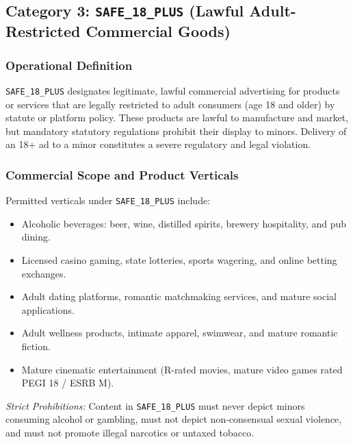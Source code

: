 \documentclass[12pt,a4paper]{report}
\begin{document}
\subsection{Category 3: \texttt{SAFE\_18\_PLUS} (Lawful Adult-Restricted Commercial Goods)}

\subsubsection{Operational Definition}
\texttt{SAFE\_18\_PLUS} designates legitimate, lawful commercial advertising for products or services that are legally restricted to adult consumers (age 18 and older) by statute or platform policy. These products are lawful to manufacture and market, but mandatory statutory regulations prohibit their display to minors. Delivery of an 18+ ad to a minor constitutes a severe regulatory and legal violation.

\subsubsection{Commercial Scope and Product Verticals}
Permitted verticals under \texttt{SAFE\_18\_PLUS} include:
\begin{itemize}
    \item Alcoholic beverages: beer, wine, distilled spirits, brewery hospitality, and pub dining.
    \item Licensed casino gaming, state lotteries, sports wagering, and online betting exchanges.
    \item Adult dating platforms, romantic matchmaking services, and mature social applications.
    \item Adult wellness products, intimate apparel, swimwear, and mature romantic fiction.
    \item Mature cinematic entertainment (R-rated movies, mature video games rated PEGI 18 / ESRB M).
\end{itemize}
\emph{Strict Prohibitions:} Content in \texttt{SAFE\_18\_PLUS} must never depict minors consuming alcohol or gambling, must not depict non-consensual sexual violence, and must not promote illegal narcotics or untaxed tobacco.
\end{document}
